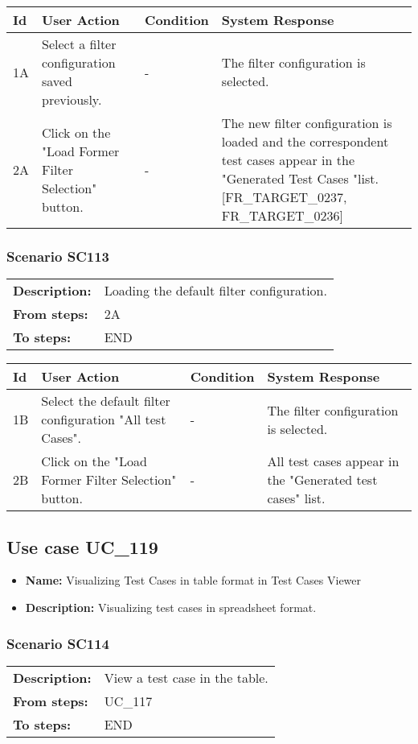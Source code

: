 \documentclass[a4paper,11pt]{article}
\newcommand{\bl}{\\ \hline}
\begin{document}
\begin{tabular}{|p{0.8in}|p{1.6in}|p{1.6in}|p{1.6in}|}
\hline
Id & User Action & Condition & System Response  \bl 
1A & Select a filter configuration saved previously. & - & The filter configuration is selected.  \bl 
2A & Click on the "Load Former Filter Selection" button.
					 & - & The new filter configuration is loaded and the
						correspondent test cases appear in the "Generated Test Cases
						"list. [FR_TARGET_0237, FR_TARGET_0236] \bl 
\end{tabular}
\subsubsection*{Scenario SC113}
\begin{tabular}{p{1in}p{4in}}
{\bf Description:} & Loading the default filter configuration. \\
{\bf From steps:} & 2A \\
{\bf To steps:} & END \\
\end{tabular}
 
\begin{tabular}{|p{0.8in}|p{1.6in}|p{1.6in}|p{1.6in}|}
\hline
Id & User Action & Condition & System Response  \bl 
1B & Select the default filter configuration "All test Cases".
					 & - & The filter configuration is selected. \bl 
2B & Click on the "Load Former Filter Selection" button.
					 & - & All test cases appear in the "Generated test cases" list.
					 \bl 
\end{tabular}
\subsection*{Use case UC_119}
\begin{itemize}
\item {\bf Name: }Visualizing Test Cases in table format in Test Cases Viewer
			
\item {\bf Description: }Visualizing test cases in spreadsheet format.
			
\end{itemize}
\subsubsection*{Scenario SC114}
\begin{tabular}{p{1in}p{4in}}
{\bf Description:} & View a test case in the table. \\
{\bf From steps:} & UC_117#2M \\
{\bf To steps:} & END \\
\end{tabular}
 
\end{document}
